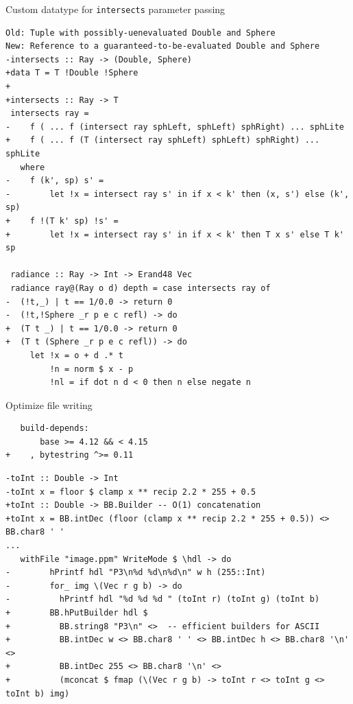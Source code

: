 \documentclass[8pt]{beamer}
\begin{document}
\begin{frame}[fragile]{Custom datatype for \texttt{intersects} parameter passing}
\begin{verbatim}
Old: Tuple with possibly-uenevaluated Double and Sphere
New: Reference to a guaranteed-to-be-evaluated Double and Sphere
-intersects :: Ray -> (Double, Sphere)
+data T = T !Double !Sphere 
+
+intersects :: Ray -> T
 intersects ray =
-    f ( ... f (intersect ray sphLeft, sphLeft) sphRight) ... sphLite
+    f ( ... f (T (intersect ray sphLeft) sphLeft) sphRight) ... sphLite
   where
-    f (k', sp) s' = 
-        let !x = intersect ray s' in if x < k' then (x, s') else (k', sp)
+    f !(T k' sp) !s' =
+        let !x = intersect ray s' in if x < k' then T x s' else T k' sp
 
 radiance :: Ray -> Int -> Erand48 Vec
 radiance ray@(Ray o d) depth = case intersects ray of
-  (!t,_) | t == 1/0.0 -> return 0
-  (!t,!Sphere _r p e c refl) -> do
+  (T t _) | t == 1/0.0 -> return 0
+  (T t (Sphere _r p e c refl)) -> do
     let !x = o + d .* t
         !n = norm $ x - p
         !nl = if dot n d < 0 then n else negate n
\end{verbatim}
\end{frame}


\begin{frame}[fragile]{Optimize file writing}
\begin{verbatim}
   build-depends:
       base >= 4.12 && < 4.15
+    , bytestring ^>= 0.11
\end{verbatim}
\begin{verbatim}
-toInt :: Double -> Int
-toInt x = floor $ clamp x ** recip 2.2 * 255 + 0.5
+toInt :: Double -> BB.Builder -- O(1) concatenation
+toInt x = BB.intDec (floor (clamp x ** recip 2.2 * 255 + 0.5)) <> BB.char8 ' '
... 
   withFile "image.ppm" WriteMode $ \hdl -> do
-        hPrintf hdl "P3\n%d %d\n%d\n" w h (255::Int)
-        for_ img \(Vec r g b) -> do
-          hPrintf hdl "%d %d %d " (toInt r) (toInt g) (toInt b)
+        BB.hPutBuilder hdl $
+          BB.string8 "P3\n" <>  -- efficient builders for ASCII
+          BB.intDec w <> BB.char8 ' ' <> BB.intDec h <> BB.char8 '\n' <>
+          BB.intDec 255 <> BB.char8 '\n' <>
+          (mconcat $ fmap (\(Vec r g b) -> toInt r <> toInt g <> toInt b) img)
\end{verbatim}
\end{frame}
\end{document}
